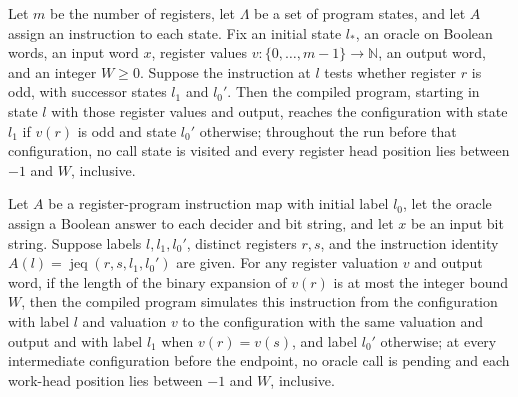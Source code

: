 \begin{lemma}
\label{Complexity.LogProg.sim_jodd}
\leanok
{}
Let $m$ be the number of registers, let $\Lambda$ be a set of program states, and let
$A$ assign an instruction to each state. Fix an initial state $l_*$, an oracle on
Boolean words, an input word $x$, register values
$v\colon\{0,\ldots,m-1\}\to\mathbb{N}$, an output word, and an integer $W\ge 0$. Suppose
the instruction at $l$ tests whether register $r$ is odd, with successor states $l_1$
and $l_0'$. Then the compiled program, starting in state $l$ with those register values
and output, reaches the configuration with state $l_1$ if $v(r)$ is odd and state $l_0'$
otherwise; throughout the run before that configuration, no call state is visited and
every register head position lies between $-1$ and $W$, inclusive.
\end{lemma}

\begin{lemma}
\label{Complexity.LogProg.sim_jeq}
\leanok
{}
Let $A$ be a register-program instruction map with initial label $l_0$, let the oracle
assign a Boolean answer to each decider and bit string, and let $x$ be an input bit
string. Suppose labels $l,l_1,l_0'$, distinct registers $r,s$, and the instruction
identity $A(l)=\operatorname{jeq}(r,s,l_1,l_0')$ are given. For any register valuation
$v$ and output word, if the length of the binary expansion of $v(r)$ is at most the
integer bound $W$, then the compiled program simulates this instruction from the
configuration with label $l$ and valuation $v$ to the configuration with the same
valuation and output and with label $l_1$ when $v(r)=v(s)$, and label $l_0'$ otherwise;
at every intermediate configuration before the endpoint, no oracle call is pending and
each work-head position lies between $-1$ and $W$, inclusive.
\end{lemma}

